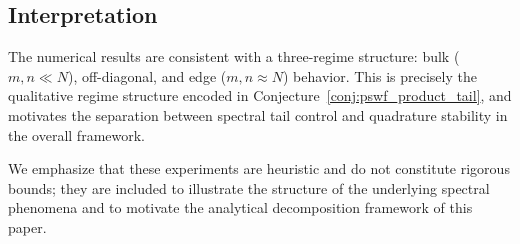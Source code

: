 \subsection{Interpretation}
\label{sec:numerics-interp}

The numerical results are consistent with a
three-regime structure:
bulk ($m, n \ll N$),
off-diagonal, and edge ($m, n \approx N$) behavior.
This is precisely the qualitative regime structure
encoded in Conjecture~\ref{conj:pswf_product_tail},
and motivates the separation between spectral tail control
and quadrature stability in the overall framework.

We emphasize that these experiments are heuristic
and do not constitute rigorous bounds;
they are included to illustrate
the structure of the underlying spectral phenomena
and to motivate the analytical decomposition framework
of this paper.





